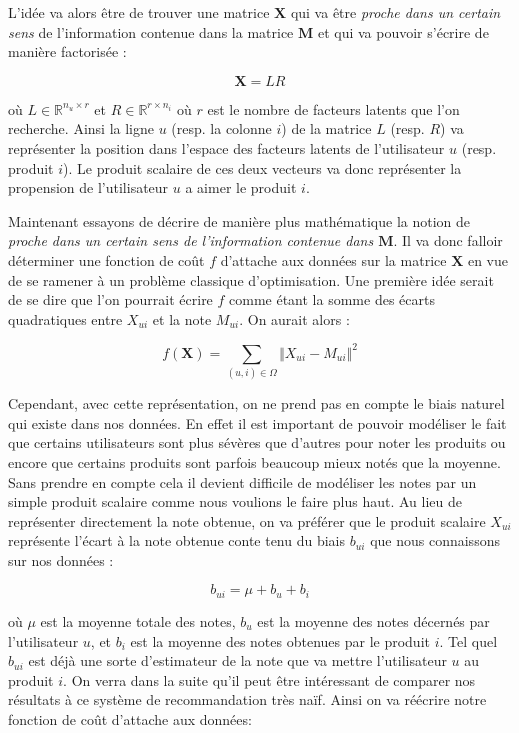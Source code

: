 \documentclass[10pt,a4paper]{article}
\begin{document}
L'idée va alors être de trouver une matrice $\textbf{X}$ qui va être \textit{proche dans un certain sens} de l'information contenue dans la matrice $\textbf{M}$ et qui va pouvoir s'écrire de manière factorisée :

$$ \textbf{X} = LR $$

où $L \in \mathbb{R}^{n_u\times r}$ et $R \in \mathbb{R}^{r\times n_i}$ où $r$ est le nombre de facteurs latents que l'on recherche. Ainsi la ligne $u$ (resp. la colonne $i$) de la matrice $L$ (resp. $R$) va représenter la position dans l'espace des facteurs latents de l'utilisateur $u$ (resp. produit $i$). Le produit scalaire de ces deux vecteurs va donc représenter la propension de l'utilisateur $u$ a aimer le produit $i$. 

Maintenant essayons de décrire de manière plus mathématique la notion de \textit{proche dans un certain sens de l'information contenue dans $\textbf{M}$}. Il va donc falloir déterminer une fonction de coût $f$ d'attache aux données sur la matrice $\textbf{X}$ en vue de se ramener à un problème classique d'optimisation. Une première idée serait de se dire que l'on pourrait écrire $f$ comme étant la somme des écarts quadratiques entre $X_{ui}$ et la note $M_{ui}$. On aurait alors :

$$ f(\textbf{X}) = \sum_{(u,i)\in\Omega}\Vert X_{ui}-M_{ui} \Vert^2 $$

Cependant, avec cette représentation, on ne prend pas en compte le biais naturel qui existe dans nos données. En effet il est important de pouvoir modéliser le fait que certains utilisateurs sont plus sévères que d'autres pour noter les produits ou encore que certains produits sont parfois beaucoup mieux notés que la moyenne. Sans prendre en compte cela il devient difficile de modéliser les notes par un simple produit scalaire comme nous voulions le faire plus haut. Au lieu de représenter directement la note obtenue, on va préférer que le produit scalaire $X_{ui}$ représente l'écart à la note obtenue conte tenu du biais $b_{ui}$ que nous connaissons sur nos données :

$$b_{ui} = \mu + b_u  + b_i $$ 

où $\mu$ est la moyenne totale des notes, $b_u$ est la moyenne des notes décernés par l'utilisateur $u$, et $b_i$ est la moyenne des notes obtenues par le produit $i$. Tel quel $b_{ui}$ est déjà une sorte d'estimateur de la note que va mettre l'utilisateur $u$ au produit $i$. On verra dans la suite qu'il peut être intéressant de comparer nos résultats à ce système de recommandation très naïf. Ainsi on va réécrire notre fonction de coût d'attache aux données:
\end{document}
